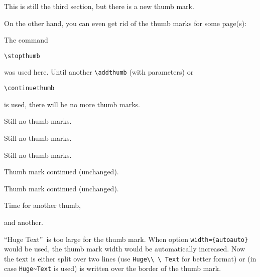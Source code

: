 \documentclass[twoside,british]{article}[2007/10/19]%
\begin{document}
\newpage


This is still the third section, but there is a new thumb mark.

On the other hand, you can even get rid of the thumb marks
for some page(s):

\newpage

\stopthumb

The command
\begin{verbatim}
\stopthumb
\end{verbatim}
was used here. Until another \verb|\addthumb| (with parameters) or
\begin{verbatim}
\continuethumb
\end{verbatim}
is used, there will be no more thumb marks.

\newpage

Still no thumb marks.

\newpage

Still no thumb marks.

\newpage

Still no thumb marks.

\newpage

\continuethumb

Thumb mark continued (unchanged).

\newpage

Thumb mark continued (unchanged).

\newpage

Time for another thumb,


and another.


\bigskip

\textquotedblleft {\Huge{Huge Text}}\textquotedblright\ is too large for
the thumb mark. When option \texttt{width=\{autoauto\}} would be used,
the thumb mark width would be automatically increased. Now the text is
either split over two lines (use \verb|Huge\\ \ Text| for better format)
or (in case \verb|Huge~Text| is used) is written over the border of the
thumb mark.\label{HugeText}


\end{document}
